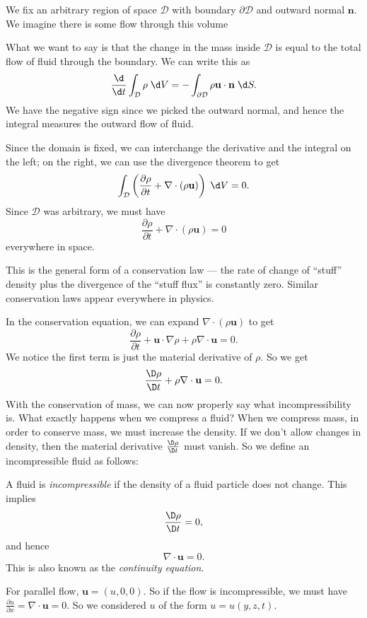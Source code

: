 \documentclass[a4paper]{article}
\begin{document}
We fix an arbitrary region of space $\mathcal{D}$ with boundary $\partial \mathcal{D}$ and outward normal $\mathbf{n}$. We imagine there is some flow through this volume
\begin{center}
\end{center}
What we want to say is that the change in the mass inside $\mathcal{D}$ is equal to the total flow of fluid through the boundary. We can write this as
\[
  \frac{\d }{\d t}\int_{\mathcal{D}} \rho \;\d V = -\int_{\partial \mathcal{D}} \rho \mathbf{u}\cdot \mathbf{n}\;\d S.
\]
We have the negative sign since we picked the outward normal, and hence the integral measures the outward flow of fluid.

Since the domain is fixed, we can interchange the derivative and the integral on the left; on the right, we can use the divergence theorem to get
\[
  \int_{\mathcal{D}} \left(\frac{\partial \rho}{\partial t} + \nabla \cdot (\rho \mathbf{u})\right) \;\d V = 0.
\]
Since $\mathcal{D}$ was arbitrary, we must have
\[
  \frac{\partial \rho}{\partial t} + \nabla \cdot (\rho \mathbf{u}) = 0
\]
everywhere in space.

This is the general form of a conservation law --- the rate of change of ``stuff'' density plus the divergence of the ``stuff flux'' is constantly zero. Similar conservation laws appear everywhere in physics.

In the conservation equation, we can expand $\nabla \cdot (\rho \mathbf{u})$ to get
\[
  \frac{\partial \rho}{\partial t} + \mathbf{u}\cdot \nabla \rho + \rho \nabla \cdot \mathbf{u} = 0.
\]
We notice the first term is just the material derivative of $\rho$. So we get
\[
  \frac{\D \rho}{\D t} + \rho \nabla \cdot \mathbf{u} = 0.
\]
With the conservation of mass, we can now properly say what incompressibility is. What exactly happens when we compress a fluid? When we compress mass, in order to conserve mass, we must increase the density. If we don't allow changes in density, then the material derivative $\frac{\D \rho}{\D t}$ must vanish. So we define an incompressible fluid as follows:
\begin{defi}
  A fluid is \emph{incompressible} if the density of a fluid particle does not change. This implies
  \[
    \frac{\D \rho}{\D t} = 0,
  \]
  and hence
  \[
    \nabla \cdot \mathbf{u} = 0.
  \]
  This is also known as the \emph{continuity equation}.
\end{defi}
For parallel flow, $\mathbf{u} = (u, 0, 0)$. So if the flow is incompressible, we must have $\frac{\partial u}{\partial x} = \nabla \cdot \mathbf{u} = 0$. So we considered $u$ of the form $u = u(y, z, t)$.
\end{document}

